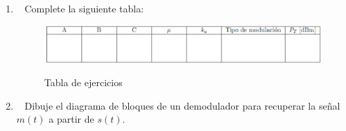 \begin{enumerate}


\begin{enumerate}
	\item~ Complete la siguiente tabla:
	
	
	\begin{figure}[h!]
		\captionsetup{justification = raggedright, singlelinecheck = false}
		\caption{Tabla de ejercicios} 
		\centering
		\includegraphics[scale=0.7]{Imagenes/tabla.png}
		\label{fig:tabla}
	\end{figure}
	
	
	
	\item~ Dibuje el diagrama de bloques de un demodulador para recuperar la señal $m(t)$ a partir de $s(t)$.
\end{enumerate}	
\end{enumerate}



